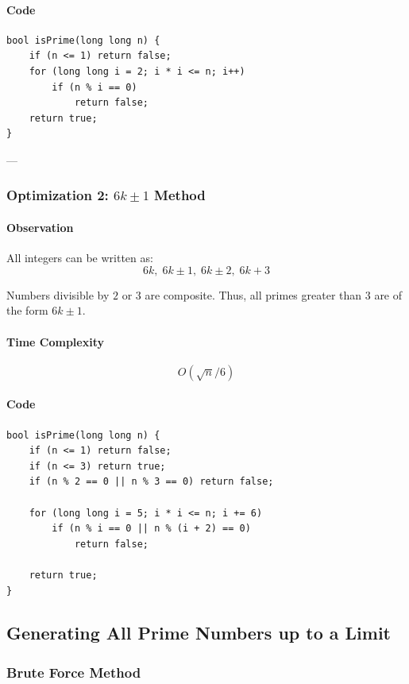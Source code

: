 \documentclass[11pt]{article}
\begin{document}
\paragraph{Code}
\begin{lstlisting}
bool isPrime(long long n) {
    if (n <= 1) return false;
    for (long long i = 2; i * i <= n; i++)
        if (n % i == 0)
            return false;
    return true;
}
\end{lstlisting}

---

\subsubsection{Optimization 2: $6k \pm 1$ Method}

\paragraph{Observation}
All integers can be written as:
\[
6k,\; 6k \pm 1,\; 6k \pm 2,\; 6k + 3
\]

Numbers divisible by $2$ or $3$ are composite.
Thus, all primes greater than $3$ are of the form $6k \pm 1$.

\paragraph{Time Complexity}
\[
O(\sqrt{n}/6)
\]

\paragraph{Code}
\begin{lstlisting}
bool isPrime(long long n) {
    if (n <= 1) return false;
    if (n <= 3) return true;
    if (n % 2 == 0 || n % 3 == 0) return false;

    for (long long i = 5; i * i <= n; i += 6)
        if (n % i == 0 || n % (i + 2) == 0)
            return false;

    return true;
}
\end{lstlisting}

\subsection{Generating All Prime Numbers up to a Limit}

\subsubsection{Brute Force Method}
\end{document}
